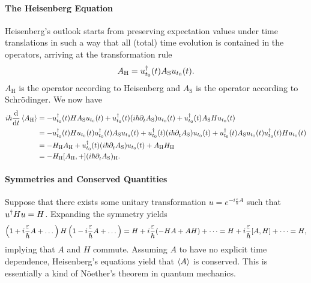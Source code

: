 \paragraph{The Heisenberg Equation}
Heisenberg's outlook starts from preserving expectation values under time translations in such a way that all (total) time evolution is contained in the operators, arriving at the transformation rule
\begin{align*}
A_{\text{H}} = u_{t_{0}}^{\dagger}(t)A_{\text{S}}u_{t_{0}}(t).
\end{align*}
$A_{\text{H}}$ is the operator according to Heisenberg and $A_{\text{S}}$ is the operator according to Schrödinger. We now have
\begin{align*}
	i\hbar\dv{t}\expval{A_{\text{H}}} &= -\adj{u_{t_{0}}}(t)HA_{\text{S}}u_{t_{0}}(t) + \adj{u_{t_{0}}}(t)(i\hbar\del{t}{A_{\text{S}}})u_{t_{0}}(t) + \adj{u_{t_{0}}}(t)A_{\text{S}}Hu_{t_{0}}(t) \\
	                                  &= -\adj{u_{t_{0}}}(t)Hu_{t_{0}}(t)\adj{u_{t_{0}}}(t)A_{\text{S}}u_{t_{0}}(t) + \adj{u_{t_{0}}}(t)(i\hbar\del{t}{A_{\text{S}}})u_{t_{0}}(t) + \adj{u_{t_{0}}}(t)A_{\text{S}}u_{t_{0}}(t)\adj{u_{t_{0}}}(t)Hu_{t_{0}}(t) \\
	                                  &= -H_{\text{H}}A_{\text{H}} + \adj{u_{t_{0}}}(t)(i\hbar\del{t}{A_{\text{S}}})u_{t_{0}}(t) + A_{\text{H}}H_{\text{H}} \\
	                                  &= -{H_{\text{H}}}\comm{A_{\text{H}}} + (i\hbar\del{t}{A_{\text{S}}})_{\text{H}}.
\end{align*}

\paragraph{Symmetries and Conserved Quantities}
Suppose that there exists some unitary transformation $u = e^{-i\frac{\varepsilon}{\hbar}A}$ such that $u^{\dagger}Hu = H$. Expanding the symmetry yields
\begin{align*}
	\left(1 + i\frac{\varepsilon}{\hbar}A + \dots\right)H\left(1 - i\frac{\varepsilon}{\hbar}A + \dots\right) = H + i\frac{\varepsilon}{\hbar}(-HA + AH) + \dots = H + i\frac{\varepsilon}{\hbar}\comm{A}{H} + \dots = H,
\end{align*}
implying that $A$ and $H$ commute. Assuming $A$ to have no explicit time dependence, Heisenberg's equations yield that $\expval{A}$ is conserved. This is essentially a kind of Nöether's theorem in quantum mechanics.

